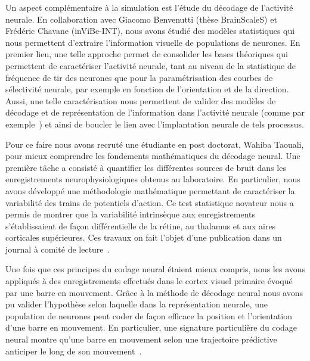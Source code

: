 \documentclass[11pt,french,a4paper,oneside]{article}%
\begin{document}
Un aspect complémentaire à la simulation est l'étude du décodage de l'activité neurale. En collaboration avec Giacomo Benvenutti (thèse BrainScaleS) et Frédéric Chavane (inViBe-INT), nous avons étudié des modèles statistiques qui nous permettent d'extraire l'information visuelle de populations de neurones. En premier lieu, une telle approche permet de consolider les bases théoriques qui permettent de caractériser l'activité neurale, tant au niveau de la statistique de fréquence de tir des neurones que pour la paramétrisation des courbes de sélectivité neurale, par exemple en fonction de l'orientation et de la direction. Aussi, une telle caractérisation nous permettent de valider des modèles de décodage et de représentation de l'information dans l'activité neurale (comme par exemple~\citep{Jazayeri06}) et ainsi de boucler le lien avec l'implantation neurale de tels processus. %

Pour ce faire nous avons recruté une étudiante en post doctorat, Wahiba Taouali, pour mieux comprendre les fondements mathématiques du décodage neural. Une première tâche a consisté à quantifier les différentes sources de bruit dans les enregistrements neurophysiologiques obtenus au laboratoire. En particulier, nous avons développé une méthodologie mathématique permettant de caractériser la variabilité des trains de potentiels d'action. Ce test statistique novateur nous a permis de montrer que la variabilité intrinsèque aux enregistrements s'établissaient de façon différentielle de la rétine, au thalamus et aux aires corticales supérieures. Ces travaux on fait l'objet d'une publication dans un journal à comité de lecture~\citep{Taouali16}.

Une fois que ces principes du codage neural étaient mieux compris, nous les avons appliqués à des enregistrements effectués dans le cortex visuel primaire  évoqué par une barre en mouvement. Grâce à la méthode de décodage neural nous avons pu valider l'hypothèse selon laquelle dans la représentation neurale, une population de neurones peut coder de façon efficace la position et l'orientation d'une barre en mouvement. En particulier, une signature particulière du codage neural montre qu'une barre en mouvement selon une trajectoire prédictive anticiper le long de son mouvement~\citep{Taouali15vss,Taouali16areadne,Perrinet19nccd}. %
\end{document}
